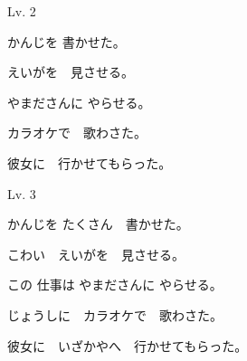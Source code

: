 	\begin{mondai}{Lv. 2}
		\item かんじを 書かせた。
		\item えいがを　見させる。
		\item やまださんに やらせる。
		\item カラオケで　歌わさた。
		\item 彼女に　行かせてもらった。
	\end{mondai}

	\begin{mondai}{Lv. 3}
		\item かんじを たくさん　書かせた。
		\item こわい　えいがを　見させる。
		\item この 仕事は やまださんに やらせる。
		\item じょうしに　カラオケで　歌わさた。
		\item 彼女に　いざかやへ　行かせてもらった。
	\end{mondai}

